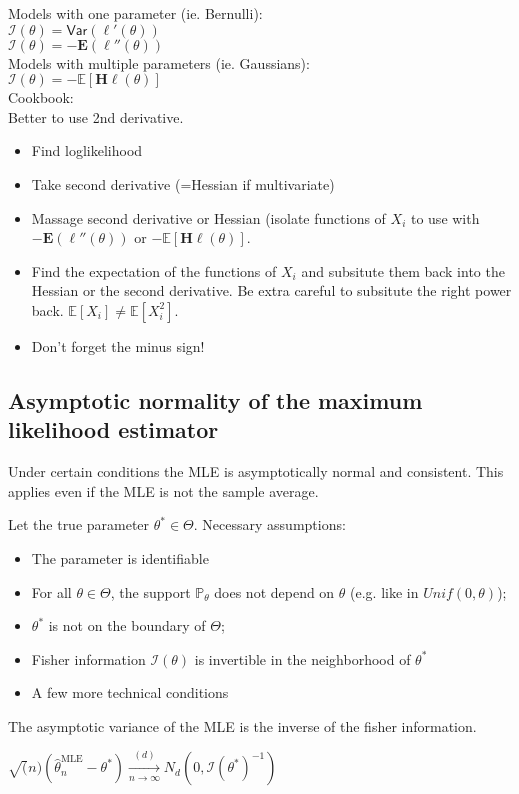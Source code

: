 Models with one parameter (ie. Bernulli):\\

$\mathcal{I}(\theta ) = \textsf{Var}(\ell '(\theta ))$\\

$\mathcal{I}(\theta ) = - \mathbf{E}(\ell ''(\theta ))$\\

Models with multiple parameters (ie. Gaussians):\\

$\mathcal{I}(\theta ) = -\mathbb E\left[\mathbf{H}\ell (\theta )\right]$\\

Cookbook:\\

Better to use 2nd derivative.\\

\begin{itemize}
  \item Find loglikelihood
  \item Take second derivative (=Hessian if multivariate)
  \item Massage second derivative or Hessian (isolate functions of $X_i$ to use with $- \mathbf{E}(\ell ''(\theta ))$ or $-\mathbb E\left[\mathbf{H}\ell (\theta )\right]$.
  \item Find the expectation of the functions of $X_i$ and subsitute them back into the Hessian or the second derivative. Be extra careful to subsitute the right power back. $\mathbb{E}[X_i] \neq \mathbb{E}[X_i^2]$.
  \item Don't forget the minus sign!
\end{itemize}

\subsection*{Asymptotic normality of the maximum likelihood estimator}

Under certain conditions the MLE is asymptotically normal and consistent. This applies even if the MLE is not the sample average.

Let the true parameter $\theta^{*} \in \Theta$. Necessary assumptions:

\begin{itemize}
\item The parameter is identifiable
\item For all $\theta \in \Theta$, the support $\mathbb{P}_{\theta}$ does not depend on $\theta$ (e.g. like in $Unif(0,\theta)$);
\item $\theta^{*}$ is not on the boundary of $\Theta$;
\item Fisher information $\mathcal{I}(\theta)$  is invertible in the neighborhood of $\theta^{*}$
\item A few more technical conditions
\end{itemize}

The asymptotic variance of the MLE is the inverse of the fisher information.

$\sqrt(n)(\widehat{\theta }_ n^{\text {MLE}} - \theta^*) \xrightarrow[n \rightarrow \infty]{(d)} N_d(0,\mathcal{I}(\theta^* )^{-1})$\\